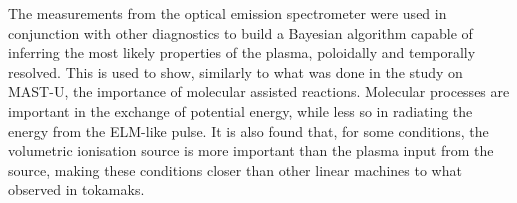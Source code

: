 The measurements from the optical emission spectrometer were used in conjunction with other diagnostics to build a Bayesian algorithm capable of inferring the most likely properties of the plasma, poloidally and temporally resolved. This is used to show, similarly to what was done in the study on MAST-U, the importance of molecular assisted reactions. Molecular processes are important in the exchange of potential energy, while less so in radiating the energy from the ELM-like pulse. It is also found that, for some conditions, the volumetric ionisation source is more important than the plasma input from the source, making these conditions closer than other linear machines to what observed in tokamaks.


